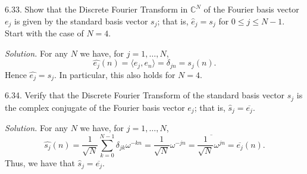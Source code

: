 \documentclass{article}
\newcommand{\C}{\mathbb{C}}
\begin{document}
\newpage

6.33. Show that the Discrete Fourier Transform in $\C^N$ of
the Fourier basis vector $e_j$ is given by the standard basis
vector $s_j$; that is, $\widehat{e}_j = s_j$ for $0 \leq j \leq N - 1$.
Start with the case of $N = 4$.

\textit{Solution.}
For any $N$ we have, for $j = 1, \ldots, N$,
%
\begin{equation*}
    \widehat{e_j}(n) = \langle e_j, e_n \rangle = \delta_{j n} = s_j(n)
    .
\end{equation*}
%
Hence $\widehat{e_j} = s_j$. In particular, this also holds for $N = 4$.

\newpage

6.34. Verify that the Discrete Fourier Transform of the
standard basis vector $s_j$ is the complex conjugate of the
Fourier basis vector $e_j$; that is,
$\widehat{s}_j = \overline{e_j}$.

\textit{Solution.}
For any $N$ we have, for $j = 1, \ldots, N$,
%
\begin{equation*}
    \widehat{s_j}(n)
    = \frac{1}{\sqrt{N}} \sum_{k = 0}^{N - 1} \delta_{j k} \omega^{-k n}
    = \frac{1}{\sqrt{N}} \omega^{-j n}
    = \overline{\frac{1}{\sqrt{N}} \omega^{j n}}
    = \overline{e_j}(n)
    .
\end{equation*}
%
Thus, we have that $\widehat{s}_j = \overline{e_j}$.
\end{document}
